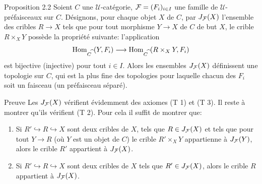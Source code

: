 \documentclass[10pt]{../fichiers-configuration-latex/smfart}
\begin{document}
\begin{enonce*}{Proposition 2.2}
Soient $C$ une $𝒰$-catégorie, ${\mathcal F}=(F_i)_{i\in I}$ une
famille de $𝒰$-préfaisceaux sur $C$. Désignons, pour
chaque objet $X$ de $C$, par $J_{{\mathcal F}}(X)$ l'ensemble des cribles
$R\rightarrow X$ tels que pour tout morphisme $Y\rightarrow X$ de
$C$ de but $X$, le crible $R\times_X Y$ possède la propriété
suivante: l'application
$$
\operatorname{Hom}_{C^{\widehat{\phantom{,}}}}(Y,F_i)\longrightarrow
\operatorname{Hom}_{C^{\widehat{\phantom{,}}}} (R\times_X Y, F_i)
$$
est bijective (\resp injective) pour tout $i\in I$. Alors les
ensembles $J_{{\mathcal F}}(X)$ définissent une topologie sur $C$, qui est
la plus fine des topologies pour laquelle chacun des $F_i$ soit un
faisceau (\resp un préfaisceau séparé).
\end{enonce*}

\begin{enonce*}[remark]{Preuve}
Les $J_{{\mathcal F}}(X)$ vérifient évidemment des axiomes (T 1) et (T
3). Il reste à montrer qu'ils vérifient (T 2). Pour cela il suffit
de montrer que:
\begin{enumerate}
\renewcommand{\labelenumi}{\theenumi)}
\item Si $R'\hookrightarrow R\hookrightarrow X$ sont deux cribles de
  $X$, tels que $R\in J_{{\mathcal F}}(X)$ et tels que pour tout
  $Y\rightarrow R$ (où $Y$ est un objet de $C$) le crible
  $R'\times_X Y$ appartienne à $J_{{\mathcal F}}(Y)$, alors le crible
  $R'$ appartient à $J_{{\mathcal F}}(X)$.

\item Si $R'\hookrightarrow R\hookrightarrow X$ sont deux cribles de
  $X$ tels que $R'\in J_{{\mathcal F}}(X)$, alors le crible $R$
  appartient à $J_{{\mathcal F}}(X)$.
\end{enumerate}
\end{enonce*}
\end{document}
